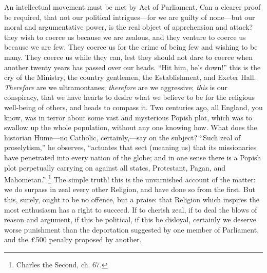 An intellectual movement must be met by Act of
Parliament. Can a clearer proof be required, that not our
political intrigues—for we are guilty of
none—but our moral and argumentative power, is the
real object of apprehension and attack? they wish to
coerce us because we are zealous, and they venture to
coerce us because we are few. They coerce us for the
crime of being few and wishing to be many. They coerce us
while they can, lest they should not dare to coerce when
another twenty years has passed over our heads. ``Hit
him, he's down!'' this is the cry of the Ministry,
the country gentlemen, the Establishment, and Exeter
Hall. \emph{Therefore} are we ultramontanes; \emph{therefore}
are we aggressive; \emph{this} is our conspiracy, that
we have hearts to desire what we believe to be for the
religious well-being of others, and heads to compass it.
Two centuries ago, all England, you know, was in terror
about some vast and mysterious Popish plot, which was to
swallow up the whole population, without any one knowing
how. What does the historian Hume—no Catholic,
certainly,—say on the subject? ``Such zeal of
proselytism,'' he observes, ``actuates that sect
(meaning us) that its missionaries have penetrated into
every nation of the globe; and in one sense there is a
Popish plot perpetually carrying on against all states,
Protestant, Pagan, and Mahometan.'' \footnote{Charles the Second, ch. 67.} The
simple truth! this is the unvarnished account of the
matter: we do surpass in zeal every other Religion, and
have done so from the first. But this, surely, ought to
be no offence, but a praise: that Religion which inspires
the most enthusiasm has a right to succeed. If to cherish
zeal, if to deal the blows of reason and argument, if
this be political, if this be disloyal, certainly we
deserve worse punishment than the deportation suggested
by one member of Parliament, and the £500 penalty
proposed by another.

